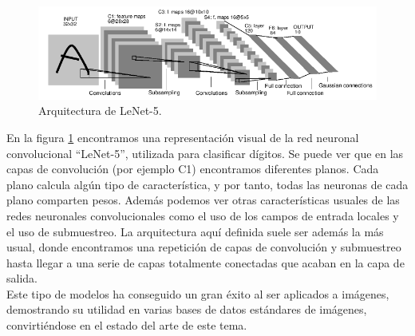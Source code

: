 \begin{figure}
\begin{center}

\includegraphics[scale=0.5]{img/lenet5.png}
\end{center}

\caption{Arquitectura de LeNet-5.}
\label{Lenet}
\end{figure}

En la figura \ref{Lenet} encontramos una representación visual de la red neuronal convolucional ``LeNet-5'', utilizada para clasificar dígitos. Se puede ver que en las capas de convolución (por ejemplo C1) encontramos diferentes planos. Cada plano calcula algún tipo de característica, y por tanto, todas las neuronas de cada plano comparten pesos. Además podemos ver otras características usuales de las redes neuronales convolucionales como el uso de los campos de entrada locales y el uso de submuestreo. La arquitectura aquí definida suele ser además la más usual, donde encontramos una repetición de capas de convolución y submuestreo hasta llegar a una serie de capas totalmente conectadas que acaban en la capa de salida.\\

Este tipo de modelos ha conseguido un gran éxito al ser aplicados a imágenes, demostrando su utilidad en varias bases de datos estándares de imágenes, convirtiéndose en el estado del arte de este tema.\\
